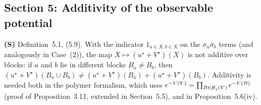 \documentclass[11pt]{amsart}
\numberwithin{equation}{section}
\newcommand{\obs}{\star}
\newcommand{\Vobs}{V^\obs}
\newcommand{\uobs}{u^\obs}
\begin{document}
\subsection*{Section 5: Additivity of the observable potential}

\noindent\textbf{(S)} Definition~5.1, (5.9). With the indicator $1_{a\in X,b\in X}$ on the
$\sigma_a\bar\sigma_b$ terms (and analogously in Case~(2)), the map
$X\mapsto(\uobs+\Vobs)(X)$ is not additive over blocks: if $a$ and $b$ lie in different blocks
$B_a\ne B_b$, then $(\uobs+\Vobs)(B_a\cup B_b)\ne(\uobs+\Vobs)(B_a)+(\uobs+\Vobs)(B_b)$. Additivity
is needed both in the polymer formalism, which uses $e^{-V(Y)}=\prod_{B\in\mathcal B_j(Y)}e^{-V(B)}$
(proof of Proposition~3.11, extended in Section~5.5), and in Proposition~5.6(iv).
\end{document}
